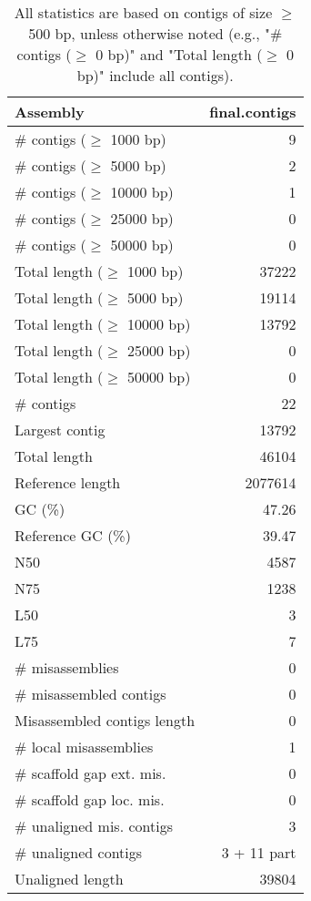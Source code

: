 \documentclass[12pt,a4paper]{article}
\begin{document}
\begin{table}[ht]
\begin{center}
\caption{All statistics are based on contigs of size $\geq$ 500 bp, unless otherwise noted (e.g., "\# contigs ($\geq$ 0 bp)" and "Total length ($\geq$ 0 bp)" include all contigs).}
\begin{tabular}{|l*{1}{|r}|}
\hline
Assembly & final.contigs \\ \hline
\# contigs ($\geq$ 1000 bp) & 9 \\ \hline
\# contigs ($\geq$ 5000 bp) & 2 \\ \hline
\# contigs ($\geq$ 10000 bp) & 1 \\ \hline
\# contigs ($\geq$ 25000 bp) & 0 \\ \hline
\# contigs ($\geq$ 50000 bp) & 0 \\ \hline
Total length ($\geq$ 1000 bp) & 37222 \\ \hline
Total length ($\geq$ 5000 bp) & 19114 \\ \hline
Total length ($\geq$ 10000 bp) & 13792 \\ \hline
Total length ($\geq$ 25000 bp) & 0 \\ \hline
Total length ($\geq$ 50000 bp) & 0 \\ \hline
\# contigs & 22 \\ \hline
Largest contig & 13792 \\ \hline
Total length & 46104 \\ \hline
Reference length & 2077614 \\ \hline
GC (\%) & 47.26 \\ \hline
Reference GC (\%) & 39.47 \\ \hline
N50 & 4587 \\ \hline
N75 & 1238 \\ \hline
L50 & 3 \\ \hline
L75 & 7 \\ \hline
\# misassemblies & 0 \\ \hline
\# misassembled contigs & 0 \\ \hline
Misassembled contigs length & 0 \\ \hline
\# local misassemblies & 1 \\ \hline
\# scaffold gap ext. mis. & 0 \\ \hline
\# scaffold gap loc. mis. & 0 \\ \hline
\# unaligned mis. contigs & 3 \\ \hline
\# unaligned contigs & 3 + 11 part \\ \hline
Unaligned length & 39804 \\ \hline

\end{tabular}
\end{center}
\end{table}
\end{document}
